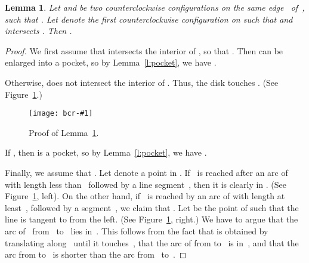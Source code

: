 \documentclass[a4paper]{article}
\newtheorem{lemma}[theorem]{Lemma}
\newcommand{\epsfigure}[2]{
  \begin{figure}[htb]
    \centerline{\texttt{[image: bcr-\#1]}}
    \caption{#2}
    \label{f:#1}
  \end{figure}}
\begin{document}
\begin{lemma}
  \label{l:twoconf}
  Let  and  be two
  counterclockwise configurations on the same edge~ of~, such
  that . Let  denote the
  first counterclockwise configuration on  such that  and  intersects . Then .
\end{lemma}
\begin{proof}
  We first assume that  intersects the interior of
  , so that . Then  can
  be enlarged into a pocket, so by Lemma~\ref{l:pocket}, we have
  .
  
  Otherwise,  does not intersect the interior
  of . Thus, the disk  touches
  . (See Figure~\ref{f:com2}.) 
\epsfigure{com2}{Proof of Lemma~\ref{l:twoconf}.}
If ,
  then  is a pocket, so by Lemma~\ref{l:pocket}, we have
  . 

  Finally, we assume that .
  Let  denote a point in .  If~ is reached after
  an arc of  with length less than~ followed by
  a line segment~, then it is clearly in . (See
  Figure~\ref{f:com2}, left).  On the other hand, if~ is reached by
  an arc of  with length at least~, followed by
  a segment~, we claim that . Let  be
  the point of  such that the line  is tangent to
   from the left.  (See Figure~\ref{f:com2}, right.)
  We have to argue that the arc of~ from~ to~
  lies in~. This follows from the fact that  is
  obtained by translating  along~ until it
  touches~, that the arc of  from 
  to~ is in~, and that the arc from  to~ is
  shorter than the arc from~ to~.
\end{proof}
\end{document}
